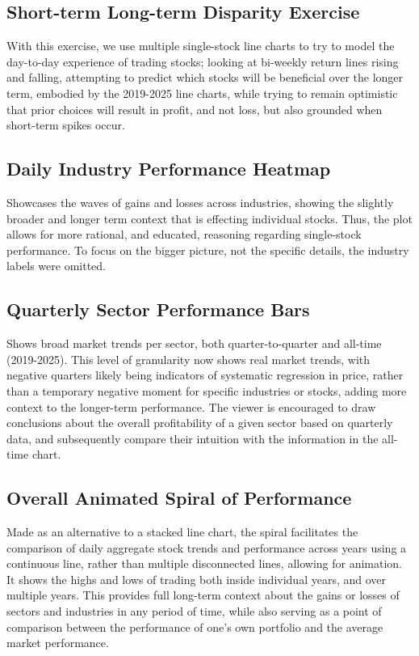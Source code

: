 \documentclass[10pt]{article}
\begin{document}
\subsection{Short-term Long-term Disparity Exercise}
With this exercise, we use multiple single-stock line charts to try to model the day-to-day experience of trading stocks; looking at bi-weekly return lines rising and falling, attempting to predict which stocks will be beneficial over the longer term, embodied by the 2019-2025 line charts, while trying to remain optimistic that prior choices will result in profit, and not loss, but also grounded when short-term spikes occur. 

\subsection{Daily Industry Performance Heatmap}
Showcases the waves of gains and losses across industries, showing the slightly broader and longer term context that is effecting individual stocks. Thus, the plot allows for more rational, and educated, reasoning regarding single-stock performance. To focus on the bigger picture, not the specific details, the industry labels were omitted.

\subsection{Quarterly Sector Performance Bars}
Shows broad market trends per sector, both quarter-to-quarter and all-time (2019-2025). This level of granularity now shows real market trends, with negative quarters likely being indicators of systematic regression in price, rather than a temporary negative moment for specific industries or stocks, adding more context to the longer-term performance. The viewer is encouraged to draw conclusions about the overall profitability of a given sector based on quarterly data, and subsequently compare their intuition with the information in the all-time chart.

\subsection{Overall Animated Spiral of Performance}
Made as an alternative to a stacked line chart, the spiral facilitates the comparison of daily aggregate stock trends and performance across years using a continuous line, rather than multiple disconnected lines, allowing for animation. It shows the highs and lows of trading both inside individual years, and over multiple years. This provides full long-term context about the gains or losses of sectors and industries in any period of time, while also serving as a point of comparison between the performance of one's own portfolio and the average market performance.
\end{document}
